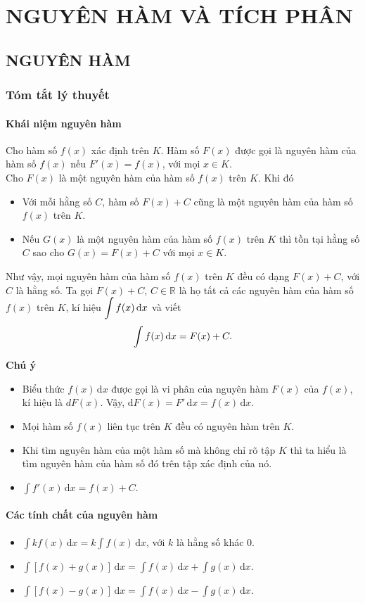 \chapter{NGUYÊN HÀM VÀ TÍCH PHÂN}
\section{NGUYÊN HÀM}
\subsection{Tóm tắt lý thuyết}
\subsubsection{Khái niệm nguyên hàm}
Cho hàm số $f(x)$ xác định trên $K$. Hàm số $F(x)$ được gọi là nguyên hàm của hàm số $f(x)$ nếu $F'(x)=f(x)$, với mọi $x\in K$.\\
Cho $F(x)$ là một nguyên hàm của hàm số $f(x)$ trên $K$. Khi đó
\begin{itemize}
	\item Với mỗi hằng số $C$, hàm số $F(x)+C$ cũng là một nguyên hàm của hàm số $f(x)$ trên $K$.
	\item Nếu $G(x)$ là một nguyên hàm của hàm số $f(x)$ trên $K$ thì tồn tại hằng số $C$ sao cho $G(x)=F(x)+C$ với mọi $x\in K$.
\end{itemize}
Như vậy, mọi nguyên hàm của hàm số $f(x)$ trên $K$ đều có dạng $F(x)+C$, với $C$ là hằng số. Ta gọi $F(x)+C$, $C\in \mathbb{R}$ là họ tất cả các nguyên hàm của hàm số $f(x)$ trên $K$, kí hiệu $\displaystyle  \displaystyle\int{f(x)\mathrm{\,d}x}$ và viết
$$\displaystyle  \displaystyle\int{f(x)\mathrm{\,d}x}=F(x)+C.$$
\begin{note}\textbf{Chú ý}
	\begin{itemize}
		\item Biểu thức $f(x)\mathrm{\,d}x$ được gọi là vi phân của nguyên hàm $F(x)$ của $f(x)$, kí hiệu là $dF(x)$.
		Vậy, $\mathrm{d}F(x)=F'\mathrm{\,d}x=f(x)\mathrm{\,d}x$.
		\item Mọi hàm số $f(x)$ liên tục trên $K$ đều có nguyên hàm trên $K$.
		\item Khi tìm nguyên hàm của một hàm số mà không chỉ rõ tập $K$ thì ta hiểu là tìm nguyên hàm của hàm số đó trên tập xác định của nó.
		\item $\displaystyle\int{f'(x)\mathrm{\,d}x}=f(x)+C$.
	\end{itemize}
\end{note}
\subsubsection{Các tính chất của nguyên hàm}
\begin{itemize}
	\item $\displaystyle\int{kf(x)\mathrm{\,d}x}=k\displaystyle\int{f(x)\mathrm{\,d}x}$, với $k$ là hằng số khác $0$.
	\item $\displaystyle\int{\left[f(x)+g(x)\right]\mathrm{\,d}x}=\displaystyle\int{f(x)\mathrm{\,d}x}+\displaystyle\int{g(x)\mathrm{\,d}x}$.
	\item $\displaystyle\int{\left[f(x)-g(x)\right]\mathrm{\,d}x}=\displaystyle\int{f(x)\mathrm{\,d}x}-\displaystyle\int{g(x)\mathrm{\,d}x}$.
\end{itemize}
